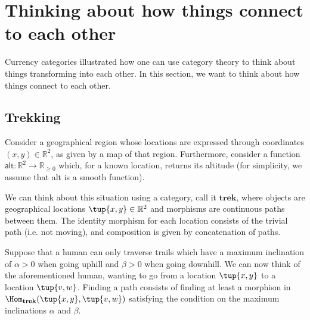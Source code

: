 
\section{Thinking about how things connect to each other}
Currency categories illustrated how one can use category theory to think about things transforming into each other. In this section, we want to think about how things connect to each other.
\subsection{Trekking}
\label{sec:trekking}
Consider a geographical region whose locations are expressed through coordinates $(x,y)\in \mathbb{R}^2$,  as given by a map of that region. Furthermore, consider a function $\mathsf{alt}: \mathbb{R}^2 \longrightarrow \mathbb{R}_{\geq 0}$ which, for a known location, returns its altitude (for simplicity, we assume that alt is a smooth function). 

We can think about this situation using a category, call it $\mathbf{trek}$, where objects are geographical locations $\tup{x,y}\in \mathbb{R}^2$ and morphisms are continuous paths between them. The identity morphism for each location consists of the trivial path (i.e. not moving), and composition is given by concatenation of paths. 

Suppose that a human can only traverse trails which have a maximum inclination of $\alpha>0$ when going uphill and $\beta>0$ when going downhill. 
We can now think of the aforementioned human, wanting to go from a location $\tup{x,y}$ to a location $\tup{v,w}$. Finding a path consists of finding at least a morphism in $\Hom_\mathbf{trek}(\tup{x,y},\tup{v,w})$ satisfying the condition on the maximum inclinations $\alpha$ and $\beta$.

